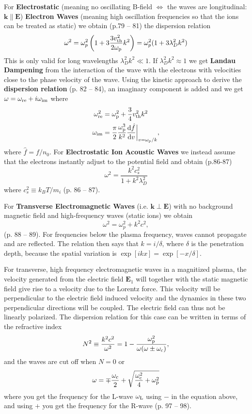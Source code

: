 \documentclass[10pt,landscape]{article}
\renewcommand{\vec}{\bm}
\newcommand{\topiccolor}{green}
\newcommand{\cbf}[1]{\textcolor{\topiccolor!80!black}{\textbf{#1}}}
\begin{document}
\begin{multicols*}{3}
For \cbf{Electrostatic} (meaning no oscillating B-field $\iff$ the waves
are longitudinal: $\vec k \parallel \vec E$)
\cbf{Electron Waves} (meaning high oscillation frequencies so that the ions
can be treated as static) we obtain (p.79 -- 81) the dispersion relation
\begin{equation*}
	\omega^2 = \omega_p^2 \left(1 + 3 \frac{3v_{\rm th}^2}{2 \omega_{\rm p}} k^2\right) = \omega_p^2 (1 + 3 \lambda_D^2 k^2)
\end{equation*}
This is only valid for long wavelengths $\lambda_D^2 k^2 \ll 1$.
If $\lambda_D^2 k^2 \approx 1$ we get \cbf{Landau Dampening}
from the interaction of the wave with the electrons with velocities close to the
phase velocity of the wave.
Using the kinetic approach to derive the \cbf{dispersion relation} (p. 82 -- 84), an imaginary
component is added and we get $\omega=\omega_{\rm re} + i\omega_{\rm im}$ where
\begin{align*}
	\omega_{\rm re}^2 &= \omega_{\rm p}^2 + \frac34 v_{\rm th}^2k^2 \\
	\omega_{\rm im} &= \frac\pi2 \frac{\omega_{\rm p}^3}{k^2}\diff{\hat{f}}{v}\biggr\rvert_{v=\omega_{\rm p}/k},
\end{align*}
where $\hat{f}=f/n_0$.
For \cbf{Electrostatic Ion Acoustic Waves} we instead assume that the electrons
instantly adjust to the potential field and obtain (p.86-87)
\[
	\omega^2 = \frac{k^2 c_s^2}{1+k^2 \lambda_D^2}
\]
where $c_s^2 \equiv k_BT/m_i$ (p. 86 -- 87).

For \cbf{Transverse Electromagnetic Waves} (i.e. $\vec k \perp \vec E$)
with no background magnetic field and high-frequency waves (static ions)
we obtain 
\begin{equation*}
	\omega^2 = \omega_p^2 +  k^2 c^2,
\end{equation*}
(p. 88 -- 89).
For frequencies below the plasma frequency, waves cannot propagate and are
reflected.
The relation then says that $k = i / \delta$,
where $\delta$ is the penetration depth, because the spatial variation is
$\exp[ikx] = \exp[-x/\delta]$.

For transverse, high frequency electromagnetic waves in a magnitized plasma, the velocity generated from the electric field $\vec E_1$ will together with the static magnetic field give rise to a velocity due to the Lorentz force. 
This velocity will be  perpendicular to the electric field induced velocity and the dynamics in these two perpendicular directions will be coupled. 
The electric field can thus not be linearly polarized.
The dispersion relation for this case can be written in terms of the refractive index 
\begin{equation*}
	N^2\equiv \frac{k^2c^2}{\omega^2} = 1 - \frac{\omega_{\rm p}^2}{\omega(\omega \pm \omega_{\rm c})},
\end{equation*}
and the waves are cut off when $N=0$ or 
\begin{equation}
	\omega = \mp \frac{\omega_{\rm c}}{2}+\sqrt{\frac{\omega_{\rm c}^2}{4}+\omega_{\rm p}^2}
\end{equation}
where you get the frequency for the L-wave $\omega_{\rm L}$ using $-$ in the equation above, and using $+$ you get the frequency for the R-wave (p. 97 -- 98).


\end{multicols*}
\end{document}
